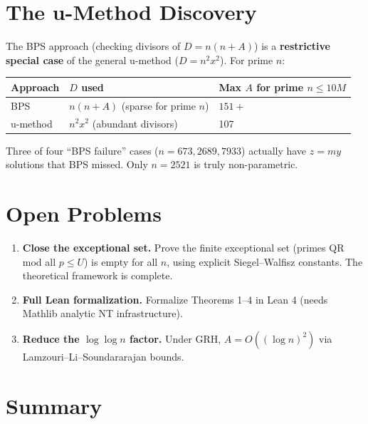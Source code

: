 \documentclass[11pt]{article}
\theoremstyle{remark}
\begin{document}
\section{The u-Method Discovery}

The BPS approach (checking divisors of $D = n(n+A)$) is a \textbf{restrictive special case} of the general u-method ($D = n^2 x^2$). For prime $n$:

\begin{center}
\begin{tabular}{lll}
\toprule
Approach & $D$ used & Max $A$ for prime $n \leq 10M$ \\
\midrule
BPS & $n(n+A)$ (sparse for prime $n$) & $151+$ \\
u-method & $n^2 x^2$ (abundant divisors) & 107 \\
\bottomrule
\end{tabular}
\end{center}

Three of four ``BPS failure'' cases ($n = 673, 2689, 7933$) actually have $z=my$ solutions that BPS missed. Only $n = 2521$ is truly non-parametric.

\section{Open Problems}

\begin{enumerate}
\item \textbf{Close the exceptional set.} Prove the finite exceptional set (primes QR mod all $p \leq U$) is empty for all $n$, using explicit Siegel--Walfisz constants. The theoretical framework is complete.
\item \textbf{Full Lean formalization.} Formalize Theorems 1--4 in Lean 4 (needs Mathlib analytic NT infrastructure).
\item \textbf{Reduce the $\log\log n$ factor.} Under GRH, $A = O((\log n)^2)$ via Lamzouri--Li--Soundararajan bounds.
\end{enumerate}

\section{Summary}
\end{document}
